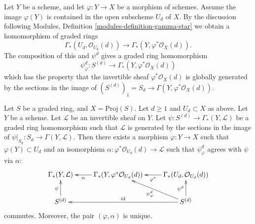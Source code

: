 \medskip\noindent
Let $Y$ be a scheme, and let $\varphi : Y \to X$ be a morphism of schemes.
Assume the image $\varphi(Y)$ is contained in the open subscheme
$U_d$ of $X$.
By the discussion following
Modules, Definition \ref{modules-definition-gamma-star}
we obtain a homomorphism of graded rings
$$
\Gamma_*(U_d, \mathcal{O}_{U_d}(d))
\longrightarrow
\Gamma_*(Y, \varphi^*\mathcal{O}_X(d)).
$$
The composition of this and $\psi^d$ gives a graded ring
homomorphism
\begin{equation}
\label{equation-psi-phi-d}
\psi_\varphi^d :
S^{(d)}
\longrightarrow
\Gamma_*(Y, \varphi^*\mathcal{O}_X(d))
\end{equation}
which has the property that the invertible sheaf
$\varphi^*\mathcal{O}_X(d)$ is globally generated
by the sections in the image of
$(S^{(d)})_1 = S_d \to \Gamma(Y, \varphi^*\mathcal{O}_X(d))$.

\begin{lemma}
\label{lemma-converse-construction}
Let $S$ be a graded ring, and $X = \text{Proj}(S)$.
Let $d \geq 1$ and $U_d \subset X$ as above.
Let $Y$ be a scheme.
Let $\mathcal{L}$ be an invertible sheaf on $Y$.
Let $\psi : S^{(d)} \to \Gamma_*(Y, \mathcal{L})$ be
a graded ring homomorphism such that $\mathcal{L}$ is
generated by the sections in the image of
$\psi|_{S_d} : S_d \to \Gamma(Y, \mathcal{L})$.
Then there exists a morphism
$\varphi : Y \to X$ such that $\varphi(Y) \subset U_d$ and
an isomorphism $\alpha : \varphi^*\mathcal{O}_{U_d}(d) \to \mathcal{L}$
such that $\psi_\varphi^d$ agrees with $\psi$ via $\alpha$:
$$
\xymatrix{
\Gamma_*(Y, \mathcal{L}) &
\Gamma_*(Y, \varphi^*\mathcal{O}_{U_d}(d)) \ar[l]^-\alpha &
\Gamma_*(U_d, \mathcal{O}_{U_d}(d)) \ar[l]^-{\varphi^*} \\
S^{(d)} \ar[u]^\psi & &
S^{(d)} \ar[u]^{\psi^d} \ar[ul]^{\psi^d_\varphi} \ar[ll]_{\text{id}}
}
$$
commutes. Moreover, the pair $(\varphi, \alpha)$ is unique.
\end{lemma}

